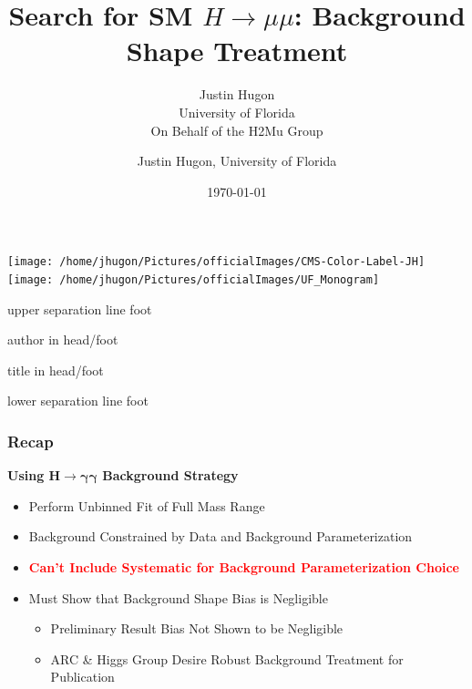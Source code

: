\documentclass{beamer}
\title{Search for SM $H \rightarrow \mu \mu$: Background Shape Treatment}
\date{\today}
\author{Justin Hugon \\ University of Florida \vspace{0.5em} \\ On Behalf of the H2Mu Group}
\newcommand{\tredbf}[1]{\textcolor{red}{\bf #1}}
\begin{document}
\begin{frame}
  \maketitle
\vspace{-1em}
  \texttt{[image: /home/jhugon/Pictures/officialImages/CMS-Color-Label-JH]}
  \hfill
  \texttt{[image: /home/jhugon/Pictures/officialImages/UF\_Monogram]}
\end{frame}

\makeatletter
{}
{
    \begin{beamercolorbox}[colsep=1.5pt]{upper separation line foot}
    \end{beamercolorbox}
    \begin{beamercolorbox}[ht=2.5ex,dp=1.125ex,%
      leftskip=.3cm,rightskip=.3cm plus1fil]{author in head/foot}%
      \hfill%
      {\insertshortinstitute}%
    \end{beamercolorbox}%
    \begin{beamercolorbox}[ht=2.5ex,dp=1.125ex,%
      leftskip=.3cm,rightskip=.3cm plus1fil]{title in head/foot}%
      {\insertshorttitle \hfill \insertframenumber}%
    \end{beamercolorbox}%
    \begin{beamercolorbox}[colsep=1.5pt]{lower separation line foot}
    \end{beamercolorbox}
}
\makeatother

\author{Justin Hugon, University of Florida}

\begin{frame}
\frametitle{Recap}
    \textbf{Using $\bm{H\rightarrow \gamma\gamma}$ Background Strategy}
    \begin{itemize}
      \item Perform Unbinned Fit of Full Mass Range
      \item Background Constrained by Data and Background Parameterization
      \item \tredbf{Can't Include Systematic for Background Parameterization Choice}
      \item Must Show that Background Shape Bias is Negligible
      \begin{itemize}
        \item Preliminary Result Bias Not Shown to be Negligible
        \item ARC \& Higgs Group Desire Robust Background Treatment for Publication
      \end{itemize}
    \end{itemize}
\end{frame}
\end{document}

